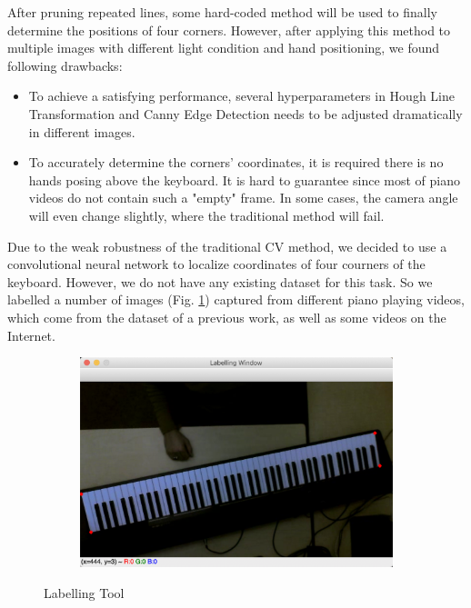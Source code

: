 \documentclass[10pt,twocolumn,letterpaper]{article}
\begin{document}
After pruning repeated lines, some hard-coded method will be used to finally determine the positions of four corners. However, after applying this method to multiple images with different light condition and hand positioning, we found following drawbacks:

\begin{itemize}
  \item To achieve a satisfying performance, several hyperparameters in Hough Line Transformation and Canny Edge Detection needs to be adjusted dramatically in different images.
  \item To accurately determine the corners' coordinates, it is required there is no hands posing above the keyboard. It is hard to guarantee since most of piano videos do not contain such a "empty" frame. In some cases, the camera angle will even change slightly, where the traditional method will fail.
\end{itemize}

Due to the weak robustness of the traditional CV method, we decided to use a convolutional neural network to localize coordinates of four courners of the keyboard. However, we do not have any existing dataset for this task. So we labelled a number of images (Fig. \ref{fig:2}) captured from different piano playing videos, which come from the dataset of a previous work, as well as some videos on the Internet.

\begin{figure}[h!]
  \hspace{2.1cm}
  \begin{subfigure}{0.24\textwidth}
    \includegraphics[width=\linewidth]{fig/7.png}
  \end{subfigure}
  \caption{Labelling Tool}
  \label{fig:2}
\end{figure}
\end{document}
